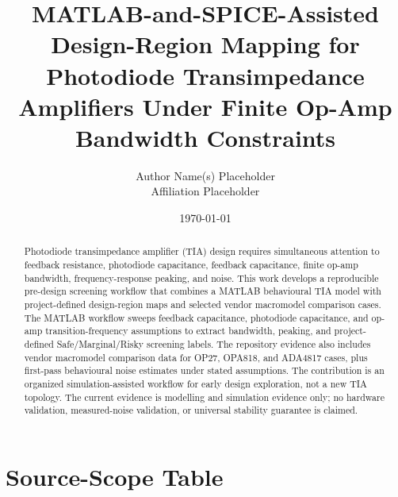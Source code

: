 \documentclass[11pt]{article}
\title{MATLAB-and-SPICE-Assisted Design-Region Mapping for Photodiode Transimpedance Amplifiers Under Finite Op-Amp Bandwidth Constraints}
\author{Author Name(s) Placeholder\\Affiliation Placeholder}
\date{\today}
\begin{document}
\maketitle

\begin{abstract}
Photodiode transimpedance amplifier (TIA) design requires simultaneous attention to feedback resistance, photodiode capacitance, feedback capacitance, finite op-amp bandwidth, frequency-response peaking, and noise. This work develops a reproducible pre-design screening workflow that combines a MATLAB behavioural TIA model with project-defined design-region maps and selected vendor macromodel comparison cases. The MATLAB workflow sweeps feedback capacitance, photodiode capacitance, and op-amp transition-frequency assumptions to extract bandwidth, peaking, and project-defined Safe/Marginal/Risky screening labels. The repository evidence also includes vendor macromodel comparison data for OP27, OPA818, and ADA4817 cases, plus first-pass behavioural noise estimates under stated assumptions. The contribution is an organized simulation-assisted workflow for early design exploration, not a new TIA topology. The current evidence is modelling and simulation evidence only; no hardware validation, measured-noise validation, or universal stability guarantee is claimed.
\end{abstract}



\FloatBarrier

\FloatBarrier

\FloatBarrier

\FloatBarrier

\FloatBarrier

\appendix
\section{Source-Scope Table}
\SourceConfidenceTable
\FloatBarrier



\end{document}

